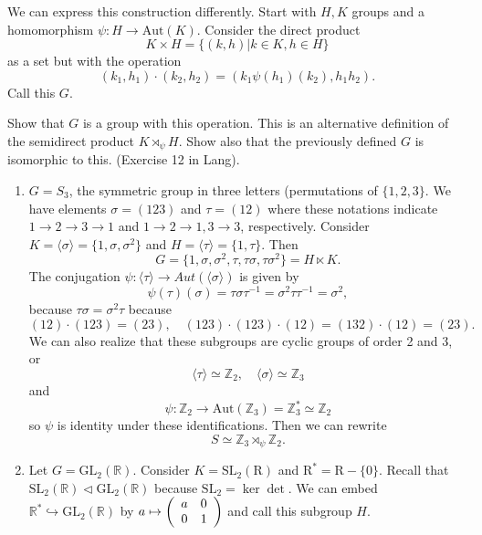\documentclass{article}
\begin{document}

We can express this construction differently. Start with
$H, K$ groups and a homomorphism $\psi : H \to \mathrm{Aut}(K)$.
Consider the direct product 
$$
K \times H = \{(k, h) | k \in K, h \in H \}
$$
as a set but with the operation
$$
(k_1, h_1) \cdot (k_2, h_2) = (k_1 \psi(h_1)(k_2), h_1 h_2).
$$
Call this $G$.

\begin{exer}
Show that $G$ is a group with this operation. This is an alternative
definition of the semidirect product $K \rtimes_\psi H$. Show also
that the previously defined $G$ is isomorphic to this. (Exercise 12 in Lang).
\end{exer}

\begin{xmpl}
\begin{enumerate}
  \item{$G = S_3$, the symmetric group in three letters (permutations
      of $\{1,2,3\}$. We have elements $\sigma = (1 2 3)$ and
      $\tau = (1 2)$ where these notations indicate $1 \to 2 \to 3 \to
      1$ and $1 \to 2 \to 1, 3 \to 3$, respectively. Consider
      $K = \langle \sigma \rangle = \{1, \sigma, \sigma^2\}$ and
      $H = \langle \tau \rangle = \{1, \tau\}$. Then
      $$
      G = \{1, \sigma, \sigma^2, \tau, \tau \sigma, \tau \sigma^2\}
        = H \ltimes K.
      $$
      The conjugation 
      $\psi : \langle \tau \rangle \to Aut(\langle \sigma \rangle)$
      is given by
      $$
      \psi(\tau)(\sigma) = \tau \sigma \tau^{-1}
                         = \sigma^2 \tau \tau^{-1} 
                         = \sigma^2,
      $$
      because $\tau \sigma = \sigma^2 \tau$ because
      $$
      (1 2) \cdot (1 2 3) = (2 3), \quad
      (1 2 3) \cdot (1 2 3) \cdot (1 2)
        = (1 3 2) \cdot (1 2) = (2 3).
      $$
      We can also realize that these subgroups are cyclic
      groups of order 2 and 3, or
      $$
      \langle \tau \rangle \simeq \mathbb{Z}_2, \quad
      \langle \sigma \rangle \simeq \mathbb{Z}_3
      $$
      and
      $$
      \psi : \mathbb{Z}_2 
           \to \mathrm{Aut}(\mathbb{Z}_3)
           =   \mathbb{Z}_3^* \simeq \mathbb{Z}_2 
      $$
      so $\psi$ is identity under these identifications.
      Then we can rewrite 
      $$S \simeq \mathbb{Z}_3 \rtimes_\psi \mathbb{Z}_2.$$
      }
  \item{Let $G = \mathrm{GL}_2(\mathbb{R})$. Consider
        $K = \mathrm{SL}_2(\mathrm{R})$ and
        $\mathrm{R}^* = \mathrm{R} - \{ 0 \}.$
        Recall that 
        $\mathrm{SL}_2(\mathbb{R}) \triangleleft
        \mathrm{GL}_2(\mathbb{R})$
        because $\mathrm{SL}_2 = \ker \det$.
        We can embed 
        $\mathbb{R}^* \hookrightarrow \mathrm{GL}_2(\mathbb{R})$
        by $a \mapsto \left(\begin{array}{c c} a & 0 \\ 0 &
            1\end{array}\right)$ and call this subgroup $H$.

}
\end{enumerate}
\end{xmpl}
\end{document}
